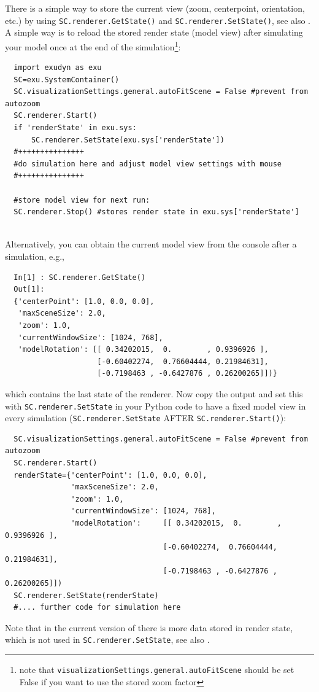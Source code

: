 There is a simple way to store the current view (zoom, centerpoint, orientation, etc.) by using \texttt{SC.renderer.GetState()} and \texttt{SC.renderer.SetState()},
see also .
%
A simple way is to reload the stored render state (model view) after simulating your model once at the end of the simulation\footnote{
note that \texttt{visualizationSettings.general.autoFitScene} should be set False if you want to use the stored zoom factor}:
\pythonstyle\begin{lstlisting}
  import exudyn as exu
  SC=exu.SystemContainer()
  SC.visualizationSettings.general.autoFitScene = False #prevent from autozoom
  SC.renderer.Start()
  if 'renderState' in exu.sys:
      SC.renderer.SetState(exu.sys['renderState']) 
  #+++++++++++++++
  #do simulation here and adjust model view settings with mouse
  #+++++++++++++++

  #store model view for next run:
  SC.renderer.Stop() #stores render state in exu.sys['renderState']
\end{lstlisting}
\horizontalRuler \\
%
Alternatively, you can obtain the current model view from the console after a simulation, e.g.,
\pythonstyle\begin{lstlisting}
  In[1] : SC.renderer.GetState()
  Out[1]: 
  {'centerPoint': [1.0, 0.0, 0.0],
   'maxSceneSize': 2.0,
   'zoom': 1.0,
   'currentWindowSize': [1024, 768],
   'modelRotation': [[ 0.34202015,  0.        , 0.9396926 ],
                     [-0.60402274,  0.76604444, 0.21984631],
                     [-0.7198463 , -0.6427876 , 0.26200265]])}
\end{lstlisting}
%
which contains the last state of the renderer.
Now copy the output and set this with \texttt{SC.renderer.SetState} in your Python code to have a fixed model view in every simulation (\texttt{SC.renderer.SetState} AFTER \texttt{SC.renderer.Start()}):
\pythonstyle\begin{lstlisting}
  SC.visualizationSettings.general.autoFitScene = False #prevent from autozoom
  SC.renderer.Start()
  renderState={'centerPoint': [1.0, 0.0, 0.0],
               'maxSceneSize': 2.0,
               'zoom': 1.0,
               'currentWindowSize': [1024, 768],
               'modelRotation':     [[ 0.34202015,  0.        ,  0.9396926 ],
                                    [-0.60402274,  0.76604444,  0.21984631],
                                    [-0.7198463 , -0.6427876 ,  0.26200265]])
  SC.renderer.SetState(renderState)
  #.... further code for simulation here
\end{lstlisting}
Note that in the current version of \codeName there is more data stored in render state, which is not used in \texttt{SC.renderer.SetState},
see also .
\horizontalRuler
%

